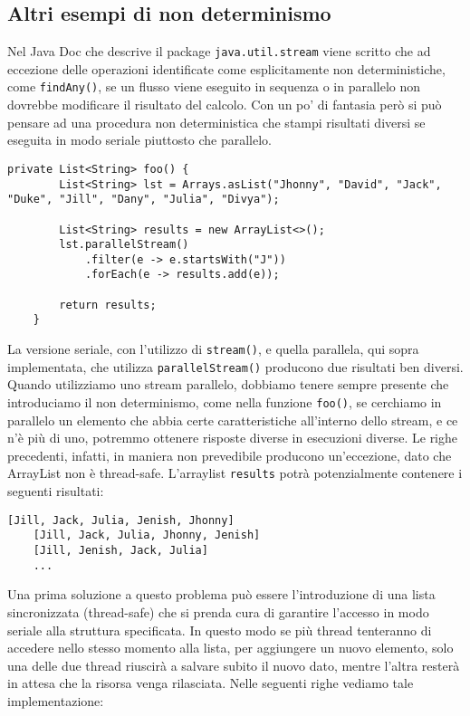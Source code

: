 		\subsection{Altri esempi di non determinismo}
			Nel Java Doc che descrive il package \lstinline|java.util.stream| viene scritto che ad eccezione delle operazioni identificate come esplicitamente non deterministiche, come \lstinline|findAny()|, se un flusso viene eseguito in sequenza o in parallelo non dovrebbe modificare il risultato del calcolo. Con un po' di fantasia però si può pensare ad una procedura non deterministica che stampi risultati diversi se eseguita in modo seriale piuttosto che parallelo.
			\begin{lstlisting}[breaklines=true]
	private List<String> foo() {
		List<String> lst = Arrays.asList("Jhonny", "David", "Jack", "Duke", "Jill", "Dany", "Julia", "Divya");
	
		List<String> results = new ArrayList<>();
		lst.parallelStream()
			.filter(e -> e.startsWith("J"))
			.forEach(e -> results.add(e));
			
		return results;
	}
			\end{lstlisting}
			La versione seriale, con l'utilizzo di \lstinline|stream()|, e quella parallela, qui sopra implementata, che utilizza \lstinline|parallelStream()| producono due risultati ben diversi. Quando utilizziamo uno stream parallelo, dobbiamo tenere sempre presente che introduciamo il non determinismo, come nella funzione \lstinline|foo()|, se cerchiamo in parallelo un elemento che abbia certe caratteristiche all'interno dello stream, e ce n'è più di uno, potremmo ottenere risposte diverse in esecuzioni diverse. Le righe precedenti, infatti, in maniera non prevedibile producono un'eccezione, dato che ArrayList non è thread-safe. L'arraylist \lstinline|results| potrà potenzialmente contenere i seguenti risultati:
			\begin{lstlisting}[numbers=none,frame=none]
	[Jill, Jack, Julia, Jenish, Jhonny]
	[Jill, Jack, Julia, Jhonny, Jenish]
	[Jill, Jenish, Jack, Julia]
	...
			\end{lstlisting}
			Una prima soluzione a questo problema può essere l'introduzione di una lista sincronizzata (thread-safe) che si prenda cura di garantire l'accesso in modo seriale alla struttura specificata. In questo modo se più thread tenteranno di accedere nello stesso momento alla lista, per aggiungere un nuovo elemento, solo una delle due thread riuscirà a salvare subito il nuovo dato, mentre l'altra resterà in attesa che la risorsa venga rilasciata. Nelle seguenti righe vediamo tale implementazione:
